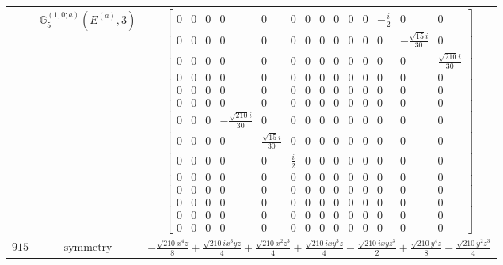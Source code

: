\documentclass[fleqn,8pt,landscape]{jsarticle}
\begin{document}
\begin{longtable}{ccc}
$  $ & $ \mathbb{G}_{5}^{(1,0;a)}(E^{(a)},3) $ & $ \begin{bmatrix} 0 & 0 & 0 & 0 & 0 & 0 & 0 & 0 & 0 & 0 & 0 & - \frac{i}{2} & 0 & 0 \\ 0 & 0 & 0 & 0 & 0 & 0 & 0 & 0 & 0 & 0 & 0 & 0 & - \frac{\sqrt{15} i}{30} & 0 \\ 0 & 0 & 0 & 0 & 0 & 0 & 0 & 0 & 0 & 0 & 0 & 0 & 0 & \frac{\sqrt{210} i}{30} \\ 0 & 0 & 0 & 0 & 0 & 0 & 0 & 0 & 0 & 0 & 0 & 0 & 0 & 0 \\ 0 & 0 & 0 & 0 & 0 & 0 & 0 & 0 & 0 & 0 & 0 & 0 & 0 & 0 \\ 0 & 0 & 0 & 0 & 0 & 0 & 0 & 0 & 0 & 0 & 0 & 0 & 0 & 0 \\ 0 & 0 & 0 & - \frac{\sqrt{210} i}{30} & 0 & 0 & 0 & 0 & 0 & 0 & 0 & 0 & 0 & 0 \\ 0 & 0 & 0 & 0 & \frac{\sqrt{15} i}{30} & 0 & 0 & 0 & 0 & 0 & 0 & 0 & 0 & 0 \\ 0 & 0 & 0 & 0 & 0 & \frac{i}{2} & 0 & 0 & 0 & 0 & 0 & 0 & 0 & 0 \\ 0 & 0 & 0 & 0 & 0 & 0 & 0 & 0 & 0 & 0 & 0 & 0 & 0 & 0 \\ 0 & 0 & 0 & 0 & 0 & 0 & 0 & 0 & 0 & 0 & 0 & 0 & 0 & 0 \\ 0 & 0 & 0 & 0 & 0 & 0 & 0 & 0 & 0 & 0 & 0 & 0 & 0 & 0 \\ 0 & 0 & 0 & 0 & 0 & 0 & 0 & 0 & 0 & 0 & 0 & 0 & 0 & 0 \\ 0 & 0 & 0 & 0 & 0 & 0 & 0 & 0 & 0 & 0 & 0 & 0 & 0 & 0 \end{bmatrix} $ \\ \hline
$ 915 $ & $ \text{symmetry} $ & $ - \frac{\sqrt{210} x^{4} z}{8} + \frac{\sqrt{210} i x^{3} y z}{4} + \frac{\sqrt{210} x^{2} z^{3}}{4} + \frac{\sqrt{210} i x y^{3} z}{4} - \frac{\sqrt{210} i x y z^{3}}{2} + \frac{\sqrt{210} y^{4} z}{8} - \frac{\sqrt{210} y^{2} z^{3}}{4} $ \\

\end{longtable}
\end{document}
